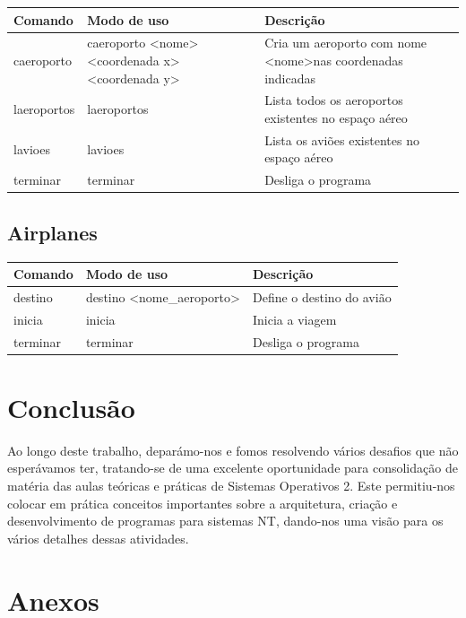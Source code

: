 \documentclass[11pt]{article}
\begin{document}
	\begin{tabularx}{\textwidth}{|l|X|X|}
	    \hline
	    \textbf{Comando} & \textbf{Modo de uso} & \textbf{Descrição} \\
	    \hline
	    caeroporto & caeroporto \textless{nome}\textgreater \textless{coordenada x}\textgreater \textless{coordenada y}\textgreater & Cria um aeroporto com nome \textless{nome}\textgreater nas coordenadas indicadas \\
	    \hline
	    laeroportos & laeroportos & Lista todos os aeroportos existentes no espaço aéreo \\
	    \hline
	    lavioes & lavioes & Lista os aviões existentes no espaço aéreo \\
	    \hline
	    terminar & terminar & Desliga o programa \\
	    \hline
	\end{tabularx}
	
	
	\large
	\subsection{Airplanes}
	\normalsize
	
	\begin{tabularx}{\textwidth}{|l|X|X|}
	    \hline
	    \textbf{Comando} & \textbf{Modo de uso} & \textbf{Descrição} \\
	    \hline
	    destino & destino \textless{nome\_aeroporto}\textgreater & Define o destino do avião \\
	    \hline
	    inicia & inicia & Inicia a viagem \\
	    \hline
	    terminar & terminar & Desliga o programa \\
	    \hline
	\end{tabularx}


	\large
	\section{Conclusão}
	\normalsize
	
	Ao longo deste trabalho, deparámo-nos e fomos resolvendo vários desafios que não esperávamos ter, tratando-se de uma excelente oportunidade para consolidação de matéria das aulas teóricas e práticas de Sistemas Operativos 2. Este permitiu-nos colocar em prática conceitos importantes sobre a arquitetura, criação e desenvolvimento de programas para sistemas NT, dando-nos uma visão para os vários detalhes dessas atividades.
	
	\pagebreak
	
	
	\large
	\section{Anexos}
	\normalsize
	
	\lstlistoflistings
\end{document}
